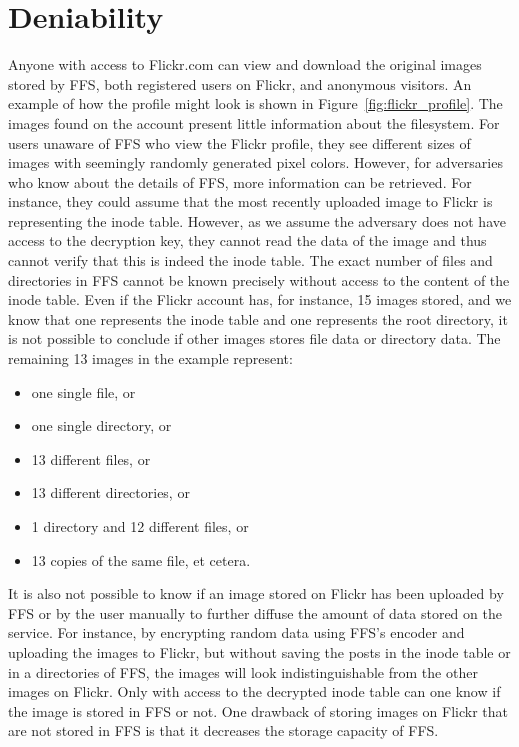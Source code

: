 \section{Deniability}
Anyone with access to Flickr.com can view and download the original images stored by FFS, both registered users on Flickr, and anonymous visitors. An example of how the profile might look is shown in Figure~\ref{fig:flickr_profile}. The images found on the account present little information about the filesystem. For users unaware of FFS who view the Flickr profile, they see different sizes of images with seemingly randomly generated pixel colors. However, for adversaries who know about the details of FFS, more information can be retrieved. For instance, they could assume that the most recently uploaded image to Flickr is representing the inode table. However, as we assume the adversary does not have access to the decryption key, they cannot read the data of the image and thus cannot verify that this is indeed the inode table. The exact number of files and directories in FFS cannot be known precisely without access to the content of the inode table. Even if the Flickr account has, for instance, 15 images stored, and we know that one represents the inode table and one represents the root directory, it is not possible to conclude if other images stores file data or directory data. The remaining 13 images in the example represent:
\begin{itemize}
	\item one single file, or
	\item one single directory, or
	\item 13 different files, or
	\item 13 different directories, or
	\item 1 directory and 12 different files, or
	\item 13 copies of the same file, et cetera.
\end{itemize}
It is also not possible to know if an image stored on Flickr has been uploaded by FFS or by the user manually to further diffuse the amount of data stored on the service. For instance, by encrypting random data using FFS's encoder and uploading the images to Flickr, but without saving the posts in the inode table or in a directories of FFS, the images will look indistinguishable from the other images on Flickr. Only with access to the decrypted inode table can one know if the image is stored in FFS or not. One drawback of storing images on Flickr that are not stored in FFS is that it decreases the storage capacity of FFS.

